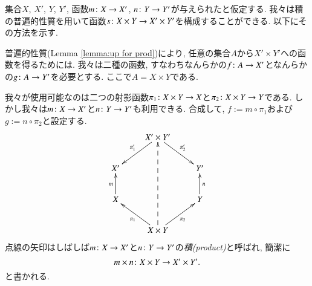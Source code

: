 \begin{example}\label{ex:product to product}

集合$X$, $X'$, $Y$, $Y'$, 函数$m\colon X\rightarrow X'$, $n\colon Y\rightarrow Y'$が与えられたと仮定する. 我々は積の普遍的性質を用いて函数$s\colon X\times Y\rightarrow X'\times Y'$を構成することができる. 以下にその方法を示す.


普遍的性質(Lemma \ref{lemma:up for prod})により, 任意の集合$A$から$X'\times Y'$への函数を得るためには. 我々は二種の函数, すなわちなんらかの$f\colon A\rightarrow X'$となんらかの$g\colon A\rightarrow Y'$を必要とする. ここで$A=X\times Y$である.


我々が使用可能なのは二つの射影函数$\pi_1\colon X\times Y\rightarrow X$と$\pi_2\colon X\times Y\rightarrow Y$である. しかし我々は$m\colon X\rightarrow X'$と$n\colon Y\rightarrow Y'$も利用できる. 合成して, $f:=m\circ \pi_1$および$g:=n\circ\pi_2$と設定する.
$$\xymatrix{
&X'\times Y'\ar[dl]_{\pi_1'}\ar[dr]^{\pi_2'}\\
X'&&Y'\\
X\ar[u]^m&&Y\ar[u]_n\\
&X\times Y\ar[ul]^{\pi_1}\ar[ur]_{\pi_2}\ar@{-->}[uuu]
}
$$
点線の矢印はしばしば$m\colon X\rightarrow X'$と$n\colon Y\rightarrow Y'$の\emph{積(product)}と呼ばれ, 簡潔に
$$m\times n\colon X\times Y\rightarrow X'\times Y'.$$
と書かれる.

\end{example}

